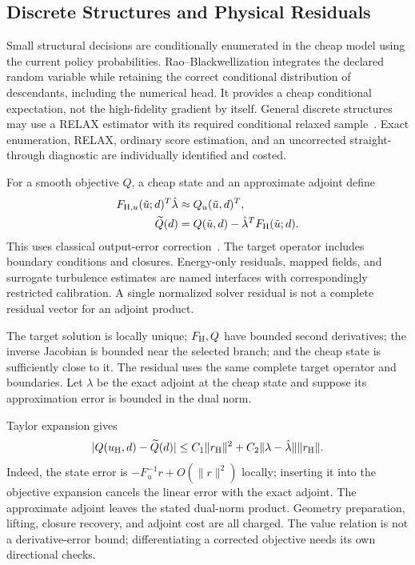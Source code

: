 \subsection{Discrete Structures and Physical Residuals}
Small structural decisions are conditionally enumerated in the cheap model using the current policy probabilities. Rao--Blackwellization integrates the declared random variable while retaining the correct conditional distribution of descendants, including the numerical head. It provides a cheap conditional expectation, not the high-fidelity gradient by itself. General discrete structures may use a RELAX estimator with its required conditional relaxed sample~\cite{grathwohl2018relax}. Exact enumeration, RELAX, ordinary score estimation, and an uncorrected straight-through diagnostic are individually identified and costed.

For a smooth objective $Q$, a cheap state and an approximate adjoint define
\begin{align}
F_{\mathrm{H},u}(\tilde u;d)^T\hat\lambda&\approx Q_u(\tilde u,d)^T,\\
\widetilde Q(d)&=Q(\tilde u,d)-\hat\lambda^TF_{\mathrm{H}}(\tilde u;d).
\label{eq:dwr}
\end{align}
This uses classical output-error correction~\cite{pierce2000adjoint,wang2024mechanism}. The target operator includes boundary conditions and closures. Energy-only residuals, mapped fields, and surrogate turbulence estimates are named interfaces with correspondingly restricted calibration. A single normalized solver residual is not a complete residual vector for an adjoint product.
\begin{assumption}
The target solution is locally unique; $F_{\mathrm{H}},Q$ have bounded second derivatives; the inverse Jacobian is bounded near the selected branch; and the cheap state is sufficiently close to it. The residual uses the same complete target operator and boundaries. Let $\lambda$ be the exact adjoint at the cheap state and suppose its approximation error is bounded in the dual norm.
\end{assumption}
Taylor expansion gives
\begin{equation}
|Q(u_{\mathrm{H}},d)-\widetilde Q(d)|
 \le C_1\|r_{\mathrm{H}}\|^2+C_2\|\lambda-\hat\lambda\|\|r_{\mathrm{H}}\|.
\label{eq:local-bound}
\end{equation}
Indeed, the state error is $-F_u^{-1}r+O(\|r\|^2)$ locally; inserting it into the objective expansion cancels the linear error with the exact adjoint. The approximate adjoint leaves the stated dual-norm product. Geometry preparation, lifting, closure recovery, and adjoint cost are all charged. The value relation is not a derivative-error bound; differentiating a corrected objective needs its own directional checks.

